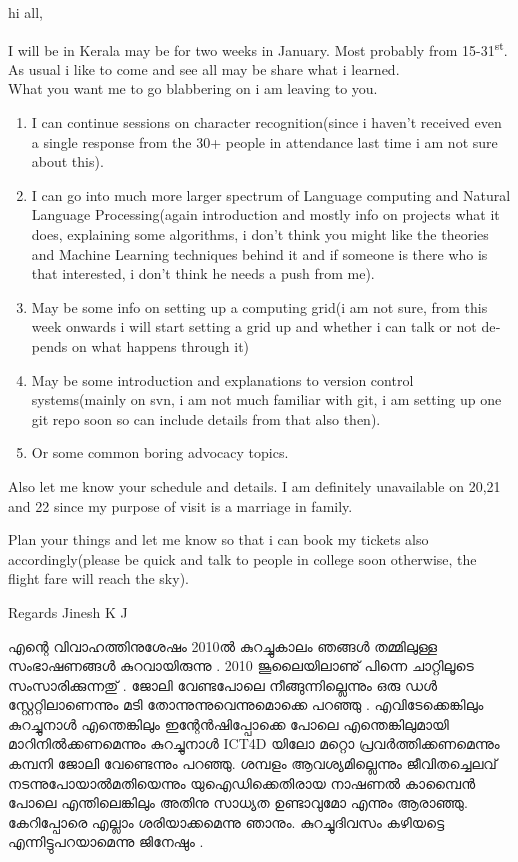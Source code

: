 \begin{english}
hi all,

I will be in Kerala may be for two weeks in January. Most probably from 15-31\textsuperscript{st}.\\
As usual i like to come and see all may be share what i learned.\\
What you want me to go blabbering on i am leaving to you.\\

\begin{enumerate}
\item I can continue sessions on character recognition(since i haven't
received even a single response from the 30+ people in attendance last
time i am not sure about this).
\item I can go into much more larger spectrum of Language computing and
Natural Language Processing(again introduction and mostly info on
projects what it does, explaining some algorithms, i don't think you
might like the theories and Machine Learning techniques behind it and
if someone is there who is that interested, i don't think he needs a
push from me).
\item May be some info on setting up a computing grid(i am not sure, from
this week onwards i will start setting a grid up and whether i can
talk or not depends on what happens through it)
\item May be some introduction and explanations to version control
systems(mainly on svn, i am not much familiar with git, i am setting
up one git repo soon so can include details from that also then).
\item Or some common boring advocacy topics.
\end{enumerate}

Also let me know your schedule and details. I am definitely
unavailable on 20,21 and 22 since my purpose of visit is a marriage in
family.

Plan your things and let me know so that i can book my tickets also
accordingly(please be quick and talk to people in college soon
otherwise, the flight fare will reach the sky).

Regards
Jinesh K J
\end{english}

എന്റെ വിവാഹത്തിനുശേഷം 2010ല്‍ കുറച്ചുകാലം ഞങ്ങള്‍ തമ്മിലുള്ള സംഭാഷണങ്ങള്‍ കുറവായിരുന്നു . 2010 ജൂലൈയിലാണു് പിന്നെ ചാറ്റിലൂടെ സംസാരിക്കുന്നതു് . ജോലി വേണ്ടപോലെ നീങ്ങുന്നില്ലെന്നും ഒരു ഡള്‍ സ്റ്റേറ്റിലാണെന്നും മടി തോന്നുന്നുവെന്നുമൊക്കെ പറഞ്ഞു . എവിടേക്കെങ്കിലും കുറച്ചുനാള്‍ എന്തെങ്കിലും ഇന്റേന്‍ഷിപ്പോക്കെ പോലെ എന്തെങ്കിലുമായി മാറിനില്‍ക്കണമെന്നും കുറച്ചുനാള്‍ ICT4D യിലോ മറ്റൊ പ്രവര്‍ത്തിക്കണമെന്നും കമ്പനി ജോലി വേണ്ടെന്നും പറഞ്ഞു. ശമ്പളം ആവശ്യമില്ലെന്നും ജീവിതച്ചെലവ് നടന്നുപോയാല്‍മതിയെന്നും യുഐഡിക്കെതിരായ നാഷണല്‍ കാമ്പൈന്‍ പോലെ എന്തിലെങ്കിലും അതിനു സാധ്യത ഉണ്ടാവുമോ എന്നും ആരാഞ്ഞു. കേറിപ്പോരെ എല്ലാം ശരിയാക്കമെന്നു ഞാനും. കുറച്ചുദിവസം കഴിയട്ടെ എന്നിട്ടുപറയാമെന്നു ജിനേഷും . 

